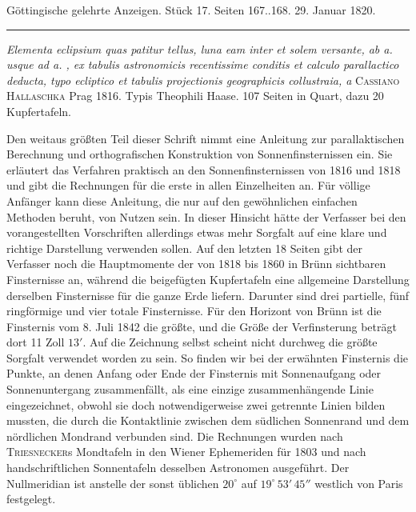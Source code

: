 \clearpage
{}
\begin{center}\small Göttingische gelehrte Anzeigen. Stück 17. Seiten 167..168. 29. Januar 1820.\\[3pt]\rule{.72\linewidth}{.3pt}\end{center}

\emph{Elementa eclipsium quas patitur tellus, luna eam inter et solem versante, ab a. {} usque ad a. {}, ex tabulis astronomicis recentissime conditis et calculo parallactico deducta, typo ecliptico et tabulis projectionis geographicis collustraia, a} \textsc{Cassiano Hallaschka} Prag 1816. Typis Theophili Haase. 107 Seiten in Quart, dazu 20 Kupfertafeln.

\begingroup{}\relax
Den weitaus größten Teil dieser Schrift nimmt eine Anleitung zur parallaktischen Berechnung und orthografischen Konstruktion von Sonnenfinsternissen ein. Sie erläutert das Verfahren praktisch an den Sonnenfinsternissen von 1816 und 1818 und gibt die Rechnungen für die erste in allen Einzelheiten an. Für völlige Anfänger kann diese Anleitung, die nur auf den gewöhnlichen einfachen Methoden beruht, von Nutzen sein. In dieser Hinsicht hätte der Verfasser bei den vorangestellten Vorschriften allerdings etwas mehr Sorgfalt auf eine klare und richtige Darstellung verwenden sollen. Auf den letzten 18 Seiten gibt der Verfasser noch die Hauptmomente der von 1818 bis 1860 in Brünn sichtbaren Finsternisse an, während die beigefügten Kupfertafeln eine allgemeine Darstellung derselben Finsternisse für die ganze Erde liefern. Darunter sind drei partielle, fünf ringförmige und vier totale Finsternisse. Für den Horizont von Brünn ist die Finsternis vom 8. Juli 1842 die größte, und die Größe der Verfinsterung beträgt dort 11 Zoll $13'$. Auf die Zeichnung selbst scheint nicht durchweg die größte Sorgfalt verwendet worden zu sein. So finden wir bei der erwähnten Finsternis die Punkte, an denen Anfang oder Ende der Finsternis mit Sonnenaufgang oder Sonnenuntergang zusammenfällt, als eine einzige zusammenhängende Linie eingezeichnet, obwohl sie doch notwendigerweise zwei getrennte Linien bilden mussten, die durch die Kontaktlinie zwischen dem südlichen Sonnenrand und dem nördlichen Mondrand verbunden sind. Die Rechnungen wurden nach \textsc{Triesnecker}s Mondtafeln in den Wiener Ephemeriden für 1803 und nach handschriftlichen Sonnentafeln desselben Astronomen ausgeführt. Der Nullmeridian ist anstelle der sonst üblichen $20^\circ$ auf $19^\circ\,53'\,45''$ westlich von Paris festgelegt.
\par\clearpage\endgroup
